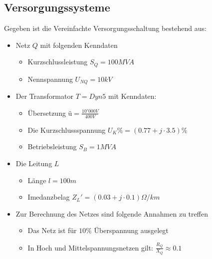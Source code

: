 \subsection{Versorgungssysteme}
Gegeben ist die Vereinfachte Versorgungsschaltung bestehend aus:

\begin{itemize}
\item Netz $Q$ mit folgenden Kenndaten
\begin{itemize}
	\item Kurzschlussleistung $S_Q = 100MVA$
	\item Nennspannung $U_{NQ} = 10kV$
\end{itemize}
\item Der Transformator $T = Dyn5$ mit Kenndaten:
\begin{itemize}
	\item Übersetzung ü$ = \frac{10'000V}{400V}$
	\item Die Kurzschlussspannung $U_K\% = (0.77+j\cdot 3.5)\%$
	\item Betriebsleistung $S_B = 1MVA$
\end{itemize}
\item Die Leitung $L$
\begin{itemize}
	\item Länge $l = 100m$
	\item Imedanzbelag $Z_L' = (0.03+j\cdot 0.1)\Omega /km$
\end{itemize}
\item Zur Berechnung des Netzes sind folgende Annahmen zu treffen
\begin{itemize}
	\item Das Netz ist für $10\%$ Überspannung ausgelegt
	\item In Hoch und Mittelspannungsnetzen gilt: $\frac{R_Q}{X_Q}\approx 0.1$
\end{itemize}
\end{itemize}

